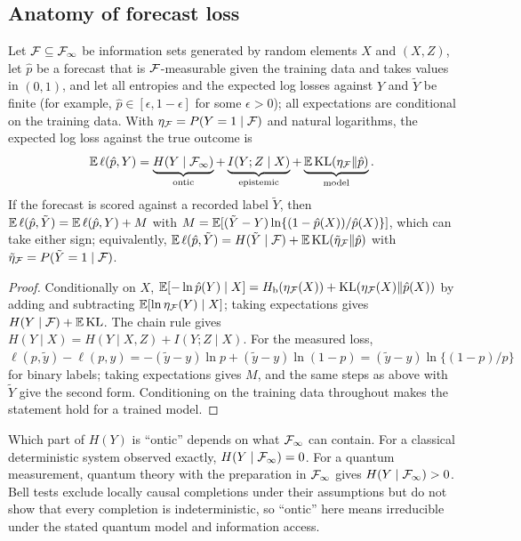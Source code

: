 \subsection{Anatomy of forecast loss}
\begin{proposition}\label{prop:appanat}
Let $\mathcal{F}\subseteq\mathcal{F}_\infty$ be information sets generated by random elements $X$ and $(X,Z)$, let $\hat p$ be a forecast that is $\mathcal{F}$-measurable given the training data and takes values in $(0,1)$, and let all entropies and the expected log losses against $Y$ and $\tilde Y$ be finite (for example, $\hat p\in[\epsilon,1-\epsilon]$ for some $\epsilon>0$); all expectations are conditional on the training data. With $\eta_{\mathcal{F}}=P(Y=1\mid\mathcal{F})$ and natural logarithms, the expected log loss against the true outcome is
\begin{equation*}
\mathbb{E}\,\ell(\hat p,Y)=\underbrace{H(Y\mid\mathcal{F}_\infty)}_{\text{ontic}}+\underbrace{I(Y;Z\mid X)}_{\text{epistemic}}+\underbrace{\mathbb{E}\,\mathrm{KL}(\eta_{\mathcal{F}}\Vert\hat p)}_{\text{model}}.
\end{equation*}
If the forecast is scored against a recorded label $\tilde Y$, then $\mathbb{E}\,\ell(\hat p,\tilde Y)=\mathbb{E}\,\ell(\hat p,Y)+M$ with $M=\mathbb{E}[(\tilde Y-Y)\ln\{(1-\hat p(X))/\hat p(X)\}]$, which can take either sign; equivalently, $\mathbb{E}\,\ell(\hat p,\tilde Y)=H(\tilde Y\mid\mathcal{F})+\mathbb{E}\,\mathrm{KL}(\tilde\eta_{\mathcal{F}}\Vert\hat p)$ with $\tilde\eta_{\mathcal{F}}=P(\tilde Y=1\mid\mathcal{F})$.
\end{proposition}
\begin{proof}
Conditionally on $X$, $\mathbb{E}[-\ln\hat p(Y)\mid X]=H_{\mathrm b}(\eta_{\mathcal{F}}(X))+\mathrm{KL}(\eta_{\mathcal{F}}(X)\Vert\hat p(X))$ by adding and subtracting $\mathbb{E}[\ln\eta_{\mathcal{F}}(Y)\mid X]$; taking expectations gives $H(Y\mid\mathcal{F})+\mathbb{E}\,\mathrm{KL}$. The chain rule gives $H(Y\mid X)=H(Y\mid X,Z)+I(Y;Z\mid X)$. For the measured loss, $\ell(p,\tilde y)-\ell(p,y)=-(\tilde y-y)\ln p+(\tilde y-y)\ln(1-p)=(\tilde y-y)\ln\{(1-p)/p\}$ for binary labels; taking expectations gives $M$, and the same steps as above with $\tilde Y$ give the second form. Conditioning on the training data throughout makes the statement hold for a trained model.
\end{proof}
Which part of $H(Y)$ is ``ontic'' depends on what $\mathcal{F}_\infty$ can contain. For a classical deterministic system observed exactly, $H(Y\mid\mathcal{F}_\infty)=0$. For a quantum measurement, quantum theory with the preparation in $\mathcal{F}_\infty$ gives $H(Y\mid\mathcal{F}_\infty)>0$. Bell tests exclude locally causal completions under their assumptions but do not show that every completion is indeterministic, so ``ontic'' here means irreducible under the stated quantum model and information access.

